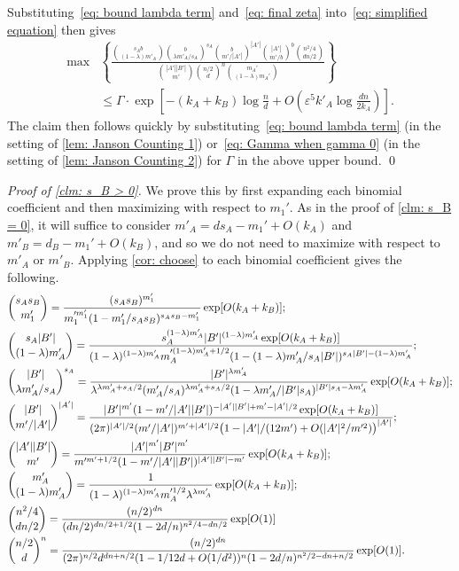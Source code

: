 \documentclass[11pt]{article}
\newcommand{\eps}{\varepsilon}
\theoremstyle{plain}
\begin{document}
Substituting~\eqref{eq: bound lambda term} and~\eqref{eq: final zeta} into~\eqref{eq: simplified equation} then gives
\begin{align*}
\max&\left\{\frac{\binom{s_Ab}{(1 - \lambda )m'_A}\binom{b}{\lambda m'_A/s_A}^{s_A}\binom{b}{m'/|A'|}^{|A'|}\binom{|A'|}{m'/b}^{b}\binom{n^2/4}{dn/2}}                {\binom{|A'||B'|}{m'}\binom{n/2}{d}^{n}\binom{m_A'}{(1 - \lambda )m_A'}}\right\}\\& \leq \Gamma \cdot\exp\left[-(k_A + k_B)\log\frac{n}{d}  + O\left(\eps^5k'_A\log\frac{dn}{2k_A}\right)\right].
\end{align*}
The claim then follows quickly by substituting~\eqref{eq: bound lambda term} (in the setting of \cref{lem: Janson Counting 1}) or~\eqref{eq: Gamma when gamma 0} (in the setting of \cref{lem: Janson Counting 2}) for $\Gamma$ in the above upper bound.
\qed

\medskip

\noindent\textit{Proof of \cref{clm: s_B > 0}.}
We prove this by first expanding each binomial coefficient and then maximizing with respect to $m_1'$. As in the proof of \cref{clm: s_B = 0}, it will suffice to consider $m'_A = ds_A - m_1' + O(k_A)$ and $m'_B = d_B - m_1' + O(k_B)$, and so we do not need to maximize with respect to $m'_A$ or $m'_B$. Applying \cref{cor: choose} to each binomial coefficient gives the following.
 \begin{align}
      &\binom{s_As_B}{m_1'} = \frac{(s_As_B)^{m_1'}}{m_1'^{m_1'}(1-m_1'/s_As_B)^{s_As_B- m_1'}}\exp[O(k_A + k_B)];\notag\\
     &\binom{s_A|B'|}{(1 - \lambda )m'_A} = \frac{s_A^{(1 - \lambda )m'_A}|B'|^{(1 - \lambda )m'_A}\exp[O(k_A + k_B)]}{(1 - \lambda )^{(1 - \lambda )m'_A}m'^{(1 - \lambda )m'_A + 1/2}_A(1 - (1 - \lambda )m'_A/s_A|B'|)^{s_A|B'| - (1 - \lambda )m'_A}};\label{eq: janson 1 choose 2}\\
    &\binom{|B'|}{\lambda m'_A/s_A}^{s_A} = \frac{|B'|^{\lambda m'_A}}{\lambda ^{\lambda m'_A + s_A/2}(m'_A/s_A)^{\lambda m'_A + s_A/2}(1 - \lambda m'_A/|B'|s_A)^{|B'|s_A - \lambda m'_A}}\exp[O(k_A + k_B)];\label{eq: janson 1 choose 3}\\
     &\binom{|B'|}{m'/|A'|}^{|A'|} = \frac{|B'|^{m'}(1 - m'/|A'||B'|)^{-|A'||B'| + m' - |A'|/2}\exp[O(k_A + k_B)]}{(2\pi)^{|A'|/2} (m'/|A'|)^{m' + |A'|/2}\big(1 - |A'|/(12m') + O(|A'|^2/m'^2)\big)^{|A'|}};\notag\\
     &\binom{|A'||B'|}{m'} = \frac{|A'|^{m'}|B'|^{m'}}{m'^{m' + 1/2}(1 - m'/|A'||B'|)^{|A'||B'| - m'}}\exp[O(k_A + k_B)];\notag\\
     &\binom{m'_A}{(1 - \lambda )m'_A} = \frac{1}{(1 - \lambda )^{(1 - \lambda )m'_A}m'^{1/2}_A\lambda ^{\lambda m'_A}}\exp[O(k_A + k_B)];\label{eq: janson 1 choose 6}\\
     &\binom{n^2/4}{dn/2}   = \frac{(n/2)^{dn}}{(dn/2)^{dn/2 + 1/2}(1 - 2d/n)^{n^2/4 - dn/2}}\exp[O(1)]\notag\\
     &\binom{n/2}{d}^n = \frac{(n/2)^{dn}}{(2\pi)^{n/2}d^{dn + n/2}(1 - 1/12d + O(1/d^2))^{n}(1 - 2d/n)^{n^2/2 - dn + n/2}}\exp[O(1)].\notag
 \end{align}
\end{document}
